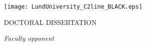 
\frontmatter %

\thispagestyle{empty} %
\begin{center}
  \vspace*{5cm}
  {\Large \myMainTitle}
\end{center}



\cleardoublepage
\thispagestyle{empty} %
~
\vspace*{0.80cm}
\begin{center}
  {\Huge \myMainTitle}
  \\[4mm]
  {\Large \mySubTitle}

  \vspace*{6ex}

  {\Large\myName}

  \vspace*{6ex}
  \texttt{[image: LundUniversity\_C2line\_BLACK.eps]}

  \vspace*{8ex}

  {\small DOCTORAL DISSERTATION}



  \vfill

  {\small
    \myDefenceAnnouncement
  }

  \vfill

  {%
    {\small\itshape Faculty opponent}\\[1mm]
    \myOpponent
  }
  \\
\end{center}
\vfill

\newpage

